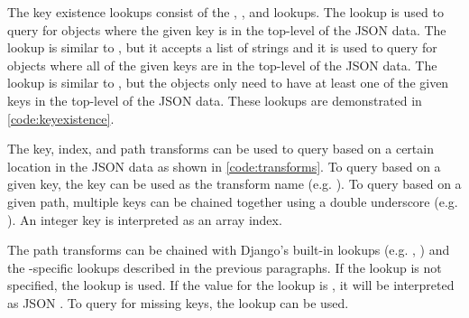 \noindent
\begin{minipage}{\linewidth}

\end{minipage}

The key existence lookups consist of the , , and
 lookups. The  lookup is used to query for
objects where the given key is in the top-level of the JSON data. The
 lookup is similar to , but it accepts a list of
strings and it is used to query for objects where all of the given keys are
in the top-level of the JSON data. The  lookup is similar
to , but the objects only need to have at least one of the
given keys in the top-level of the JSON data. These lookups are demonstrated in
\autoref{code:keyexistence}.

\noindent
\begin{minipage}{\linewidth}

\end{minipage}

The key, index, and path transforms can be used to query based on a certain
location in the JSON data as shown in \autoref{code:transforms}. To query based
on a given key, the key can be used as the transform name (e.g.
). To query based on a given path, multiple keys can be
chained together using a double underscore (e.g. ).
An integer key is interpreted as an array index.

The path transforms can be chained with Django's built-in lookups (e.g.
, ) and the -specific lookups
described in the previous paragraphs. If the lookup is not specified, the
 lookup is used. If the value for the  lookup is
, it will be interpreted as JSON . To query for missing
keys, the  lookup can be used.
